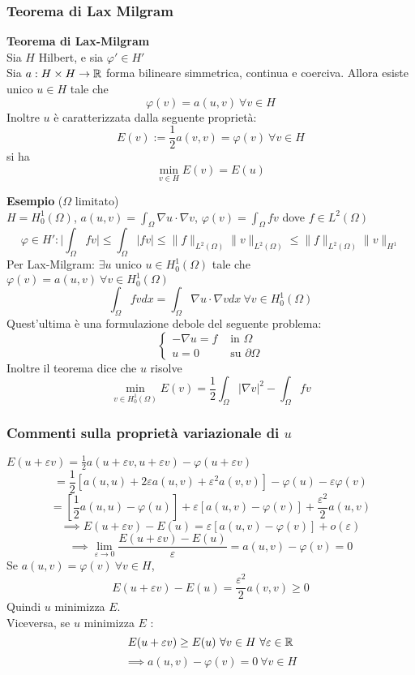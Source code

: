 \subsubsection{Teorema di Lax Milgram}
\begin{tcolorbox}
\textbf{Teorema di Lax-Milgram}
\\Sia $H$ Hilbert, e sia $\varphi'\in H'$ 
\\Sia $a:H\times H\to \mathbb{R} $ forma bilineare simmetrica, continua e coerciva.
Allora esiste unico $u\in H$ tale che
\[\varphi(v)=a(u,v)\ \forall v\in H\]
Inoltre $u$ è caratterizzata dalla seguente proprietà: 
\[E(v):=\frac{1}{2}a(v,v)=\varphi(v)\ \forall v\in H\]
si ha 
\[\min_{v\in H}E(v)=E(u)\]
\end{tcolorbox}
\textbf{Esempio} ($\Omega$ limitato)
\\$H=H_0^1(\Omega)$, $a(u,v)=\int_{\Omega}^{} \nabla u\cdot \nabla v $, $\varphi(v)=\int_{\Omega}^{} fv $ dove $f\in L^{2}(\Omega)$ 
\[\varphi\in H':\bigg|\int_{\Omega}^{} fv\bigg|\le \int_{\Omega}^{} |fv|\le \|f\|_{L^{2}(\Omega)}\|v\|_{L^{2}(\Omega)}\le \|f\|_{L^{2}(\Omega)}\|v\|_{H^1}\]
Per Lax-Milgram: $\exists u$ unico $u\in H^1_0(\Omega)$ tale che $\varphi(v)=a(u,v)\ \forall v\in H_0^1(\Omega)$ 
\[\int_{\Omega}^{} fvdx=\int_{\Omega}^{} \nabla u\cdot \nabla vdx\ \forall v\in H_0^1(\Omega)\]
Quest'ultima è una formulazione debole del seguente problema:
\[\begin{cases}
	-\nabla u=f&\text{ in }\Omega
	\\u=0&\text{ su }\partial\Omega
\end{cases}\]
Inoltre il teorema dice che $u$ risolve 
\[\min_{v\in H_0^1(\Omega)}E(v)=\frac{1}{2} \int_{\Omega}^{} |\nabla v|^2-\int_{\Omega}^{} fv\]
\subsubsection{Commenti sulla proprietà variazionale di $u$ }
$E(u+\varepsilon v)=\frac{1}{2}a(u+\varepsilon v,u+\varepsilon v)-\varphi(u+\varepsilon v)$
\[=\frac{1}{2}[a(u,u)+2\varepsilon a(u,v)+\varepsilon^2a(v,v)]-\varphi(u)-\varepsilon\varphi(v)\]
\[=[\frac{1}{2}a(u,u)-\varphi(u)]+\varepsilon[a(u,v)-\varphi(v)]+ \frac{\varepsilon^2}{2}a(u,v)\]
\[\implies E(u+\varepsilon v)-E(u)=\varepsilon [a(u,v)-\varphi(v)]+o(\varepsilon)\]
\[\implies \lim_{\varepsilon \to 0} \frac{E(u+\varepsilon v)-E(u)}{\varepsilon}=a(u,v)-\varphi(v)=0\]
Se $a(u,v)=\varphi(v)\ \forall v\in H$, 
\[E(u+\varepsilon v)-E(u)= \frac{\varepsilon^2}{2}a(v,v)\ge 0\]
Quindi $u$ minimizza $E$.
\\Viceversa, se $u $ minimizza $E$ :
\[E(u+\varepsilon v)\ge E(u)\ \forall v\in H\ \forall \varepsilon\in \mathbb{R}\]
\[\implies a(u,v)-\varphi(v)=0\ \forall v\in H\]

